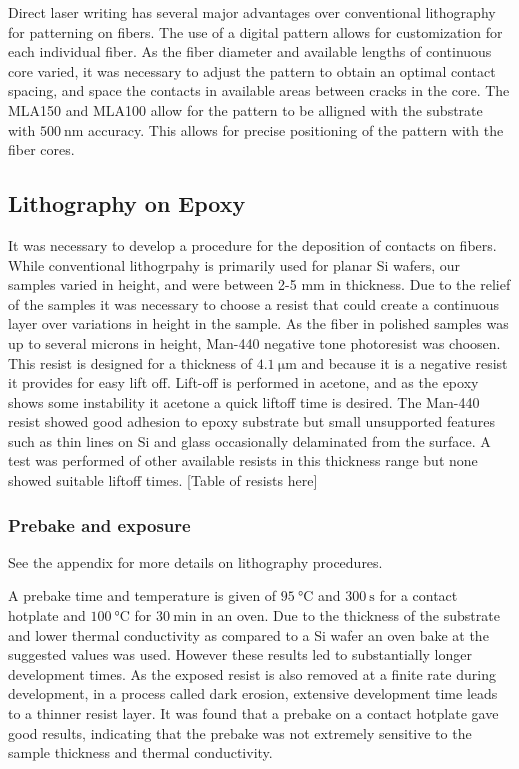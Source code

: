 Direct laser writing has several major advantages over conventional lithography for patterning on fibers. The use of a digital pattern allows for customization for each individual fiber. As the fiber diameter and available lengths of continuous core varied, it was necessary to adjust the pattern to obtain an optimal contact spacing, and space the contacts in available areas between cracks in the core. The MLA150 and MLA100 allow for the pattern to be alligned with the substrate with $\SI{500}{\nm}$ accuracy. This allows for precise positioning of the pattern with the fiber cores. 

\subsection{Lithography on Epoxy}
It was necessary to develop a procedure for the deposition of contacts on fibers. While conventional lithogrpahy is primarily used for planar Si wafers, our samples varied in height, and were between 2-5 mm in thickness. Due to the relief of the samples it was necessary to choose a resist that could create a continuous layer over variations in height in the sample. As the fiber in polished samples was up to several microns in height, Man-440 negative tone photoresist was choosen. This resist is designed for a thickness of $\SI{4.1}{\micro \meter}$ and because it is a negative resist it provides for easy lift off. Lift-off is performed in acetone, and as the epoxy shows some instability it acetone a quick liftoff time is desired. The Man-440 resist showed good adhesion to epoxy substrate but small unsupported features such as thin lines on Si and glass occasionally delaminated from the surface. A test was performed of other available resists in this thickness range but none showed suitable liftoff times. [Table of resists here] 
\subsubsection{Prebake and exposure}
See the appendix for more details on lithography procedures.

A prebake time and temperature is given of $\SI{95}{\celsius}$ and $\SI{300}{\second}$ for a contact hotplate and $\SI{100}{\celsius}$ for  $\SI{30}{\minute}$ in an oven. 
 Due to the thickness of the substrate and lower thermal conductivity as compared to a Si wafer an oven bake at the suggested values was used. However these results led to substantially longer development times. As the exposed resist is also removed at a finite rate during development, in a process called dark erosion, extensive development time leads to a thinner resist layer. It was found that a prebake on a contact hotplate gave good results, indicating that the prebake was not extremely sensitive to the sample thickness and thermal conductivity. 
 

